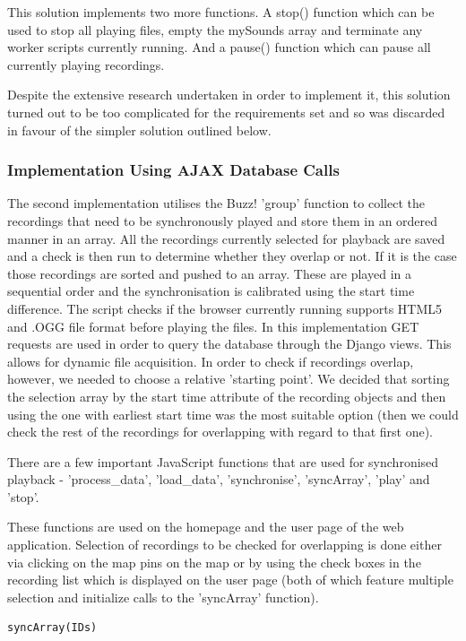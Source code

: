 \documentclass{l3proj}
\begin{document}
This solution implements two more functions. A stop() function which can be used to stop all playing files, empty the mySounds array and terminate any worker scripts currently running. And a pause() function which can pause all currently playing recordings.

Despite the extensive research undertaken in order to implement it, this solution turned out to be too complicated for the requirements set and so was discarded in favour of the simpler solution outlined below.

\subsubsection{Implementation Using \gls{AJAX} Database Calls}
The second implementation utilises the Buzz! 'group' function to collect the recordings that need to be synchronously played and store them in an ordered manner in an array. All the recordings currently selected for playback are saved and a check is then run to determine whether they overlap or not. If it is the case those recordings are sorted and pushed to an array. These are played in a sequential order and the synchronisation is calibrated using the start time difference. The script checks if the browser currently running supports HTML5  and .OGG file format before playing the files. In this implementation GET requests are used in order to query the database through the \gls{Django} views. This allows for dynamic file acquisition. In order to check if recordings overlap, however, we needed to choose a relative 'starting point'. We decided that sorting the selection array by the start time attribute of the recording objects and then using the one with earliest start time was the most suitable option (then we could check the rest of the recordings for overlapping with regard to that first one).

There are a few important \gls{JavaScript} functions that are used for synchronised playback - 'process\_data', 'load\_data', 'synchronise', 'syncArray', 'play' and 'stop'.

These functions are used on the homepage and the user page of the web application. Selection of recordings to be checked for overlapping is done either via clicking on the map pins on the map or by using the check boxes in the recording list which is displayed on the user page (both of which feature multiple selection and initialize calls to the 'syncArray' function).

\begin{verbatim}
syncArray(IDs)
\end{verbatim}
\end{document}
